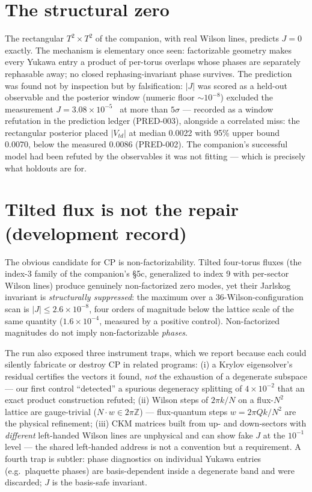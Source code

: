 \documentclass[aps,prd,preprint,nofootinbib]{revtex4-2}
\begin{document}
\section{The structural zero}

The rectangular $T^2\times T^2$ of the companion, with real Wilson lines,
predicts $J=0$ exactly. The mechanism is elementary once seen: factorizable
geometry makes every Yukawa entry a product of per-torus overlaps whose phases
are separately rephasable away; no closed rephasing-invariant phase survives.
The prediction was found not by inspection but by falsification: $|J|$ was
scored as a held-out observable and the posterior window (numeric floor $\sim
10^{-8}$) excluded the measurement $J=3.08\times 10^{-5}$~\cite{PDG} at more
than $5\sigma$ --- recorded as a window refutation in the prediction ledger
(PRED-003), alongside a correlated miss: the rectangular posterior placed
$|V_{td}|$ at median 0.0022 with 95\% upper bound 0.0070, below the measured
0.0086 (PRED-002). The companion's successful model had been refuted by the
observables it was not fitting --- which is precisely what holdouts are for.

\section{Tilted flux is not the repair (development record)}

The obvious candidate for CP is non-factorizability. Tilted four-torus fluxes
(the index-3 family of the companion's \S5c, generalized to index 9 with
per-sector Wilson lines) produce genuinely non-factorized zero modes, yet their
Jarlskog invariant is \emph{structurally suppressed}: the maximum over a
36-Wilson-configuration scan is $|J|\le 2.6\times 10^{-8}$, four orders of
magnitude below the lattice scale of the same quantity ($1.6\times 10^{-4}$,
measured by a positive control). Non-factorized magnitudes do not imply
non-factorizable \emph{phases}.

The run also exposed three instrument traps, which we report because each could
silently fabricate or destroy CP in related programs: (i) a Krylov
eigensolver's residual certifies the vectors it found, \emph{not} the
exhaustion of a degenerate subspace --- our first control ``detected'' a
spurious degeneracy splitting of $4\times 10^{-2}$ that an exact product
construction refuted; (ii) Wilson steps of $2\pi k/N$ on a flux-$N^2$ lattice
are gauge-trivial ($N\cdot w\in 2\pi\mathbb{Z}$) --- flux-quantum steps
$w=2\pi Qk/N^2$ are the physical refinement; (iii) CKM matrices built from up-
and down-sectors with \emph{different} left-handed Wilson lines are unphysical
and can show fake $J$ at the $10^{-1}$ level --- the shared left-handed address
is not a convention but a requirement. A fourth trap is subtler: phase
diagnostics on individual Yukawa entries (e.g.\ plaquette phases) are
basis-dependent inside a degenerate band and were discarded; $J$ is the
basis-safe invariant.
\end{document}
